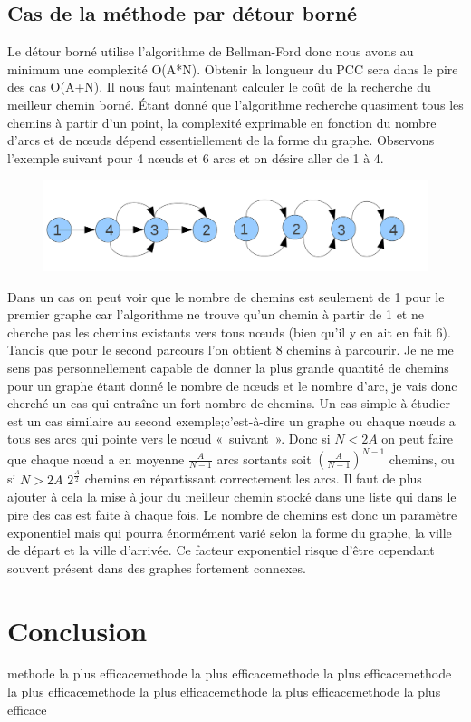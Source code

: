 \subsection{Cas de la méthode par détour borné}
Le détour borné utilise l'algorithme de Bellman-Ford donc nous avons au minimum une complexité O(A*N). Obtenir la longueur du PCC sera dans le pire des cas O(A+N).
Il nous faut maintenant calculer le coût de la recherche du meilleur chemin borné. Étant donné que l'algorithme recherche quasiment tous les chemins à partir d'un point, la complexité exprimable en fonction du nombre d'arcs et de nœuds dépend essentiellement de la forme du graphe. Observons l'exemple suivant pour 4 nœuds et 6 arcs et on désire aller de 1 à 4.
\begin{figure}[!h] 
\begin{center}
  \includegraphics[scale=0.40]{Graphe.png}
\end{center}
\end{figure} 
Dans un cas on peut voir que le nombre de chemins est seulement de 1 pour le premier graphe car l'algorithme ne trouve qu'un chemin à partir de 1 et ne cherche pas les chemins existants vers tous nœuds (bien qu'il y en ait en fait 6).  Tandis que pour le  second parcours l'on obtient 8 chemins à parcourir.
Je ne me sens pas personnellement capable de donner la plus grande quantité de chemins pour un graphe étant donné le nombre de nœuds et le nombre d'arc, je vais donc cherché un  cas qui entraîne un fort nombre de chemins. Un cas simple à étudier est un cas similaire au second exemple;c'est-à-dire un graphe ou chaque nœuds a tous ses arcs qui pointe vers le nœud « suivant ». Donc si $N<2A$ on peut faire que chaque nœud a en moyenne $\frac{A}{N-1}$ arcs sortants soit $(\frac{A}{N-1})^{N-1}$ chemins, ou si $N>2A$ $2^{\frac{A}{2}}$ chemins en répartissant correctement les arcs. Il faut de plus ajouter à cela la mise à jour du meilleur chemin stocké dans une liste qui dans le pire des cas est faite à chaque fois.
Le nombre de chemins est donc un paramètre exponentiel mais qui pourra énormément varié selon la forme du graphe, la ville de départ et la ville d'arrivée. Ce facteur exponentiel risque d'être cependant souvent présent dans des graphes fortement connexes.
\section{Conclusion}%
methode la plus efficacemethode la plus efficacemethode la plus efficacemethode la plus efficacemethode la plus efficacemethode la plus efficacemethode la plus efficace


\clearpage



